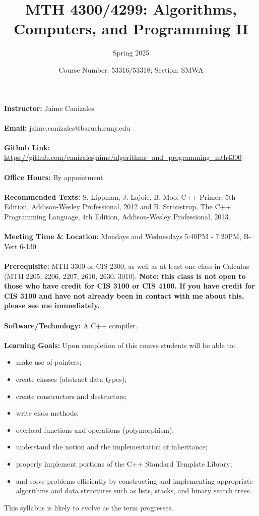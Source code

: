 \documentclass[a4paper]{article}
\title{MTH 4300/4299: Algorithms, Computers, and Programming II}
\author{Spring 2025}
\date{Course Number: 53316/53318; Section: SMWA}
\begin{document}
\maketitle

\textbf{Instructor:} Jaime Canizales\\\\
\textbf{Email:} jaime.canizales@baruch.cuny.edu\\\\
\textbf{Github Link:} \url{https://github.com/canizalesjaime/algorithms_and_programming_mth4300}\\\\
\textbf{Office Hours:} By appointment. \\\\
\textbf{Recommended Texts:} S. Lippman, J. Lajoie, B. Moo, C++ Primer, 5th Edition, Addison-Wesley
Professional, 2012 and B. Stroustrup, The C++ Programming Language, 4th Edition, Addison-Wesley
Professional, 2013.\\\\
\textbf{Meeting Time \& Location:} Mondays and Wednesdays 5:40PM - 7:20PM, B-Vert 6-130.\\\\
\textbf{Prerequisite:} MTH 3300 or CIS 2300, as well as at least one class in Calculus (MTH 2205, 2206, 2207,
2610, 2630, 3010). \textbf{Note: this class is not open to those who have credit for CIS 3100 or
CIS 4100. If you have credit for CIS 3100 and have not already been in contact with me
about this, please see me immediately.}\\\\
\textbf{Software/Technology:} A C++ compiler. \\\\
\textbf{Learning Goals:} Upon completion of this course students will be able to:
\begin{itemize}
    \item make use of pointers;
    \item create classes (abstract data types);
    \item create constructors and destructors;
    \item write class methods;
    \item overload functions and operations (polymorphism);
    \item understand the notion and the implementation of inheritance;
    \item properly implement portions of the C++ Standard Template Library;
    \item and solve problems efficiently by constructing and implementing appropriate algorithms and
    data structures such as lists, stacks, and binary search trees.
\end{itemize}
This syllabus is likely to evolve as the term progresses.
\end{document}
